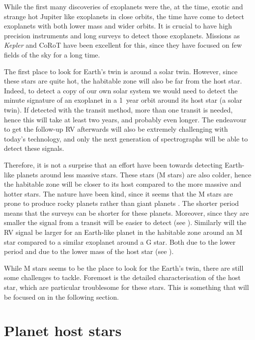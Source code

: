While the first many discoveries of exoplanets were the, at the time, exotic and strange hot Jupiter
like exoplanets in close orbits, the time have come to detect exoplanets with both lower mass and
wider orbits. It is crucial to have high precision instruments and long surveys to detect those
exoplanets. Missions as \emph{Kepler} and CoRoT have been excellent for this, since they have
focused on few fields of the sky for a long time.

The first place to look for Earth's twin is around a solar twin. However, since these stars are
quite hot, the habitable zone will also be far from the host star. Indeed, to detect a copy of our
own solar system we would need to detect the minute signature of an exoplanet in a \SI{1}{year}
orbit around its host star (a solar twin). If detected with the transit method, more than one
transit is needed, hence this will take at least two years, and probably even longer. The endeavour
to get the follow-up RV afterwards will also be extremely challenging with today's technology, and
only the next generation of spectrographs will be able to detect these signals.

Therefore, it is not a surprise that an effort have been towards detecting Earth-like planets around
less massive stars. These stars (M stars) are also colder, hence the habitable zone will be closer
to its host compared to the more massive and hotter stars. The nature have been kind, since it seems
that the M stars are prone to produce rocky planets rather than giant planets
\citep{Bonfils2013,Delfosse2013}. The shorter period means that the surveys can be shorter for these
planets. Moreover, since they are smaller the signal from a transit will be easier to detect (see
). Similarly will the RV signal be larger for an Earth-like planet in the habitable
zone around an M star compared to a similar exoplanet around a G star. Both due to the lower period
and due to the lower mass of the host star (see ).

While M stars seems to be the place to look for the Earth's twin, there are still some challenges to
tackle. Foremost is the detailed characterisation of the host star, which are particular troublesome
for these stars. This is something that will be focused on in the following section.




\section{Planet host stars}
\label{sec:planet_host_stars}

